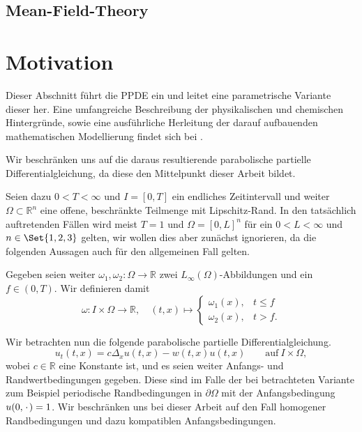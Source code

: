 \subsection{Mean-Field-Theory} %
\label{sub:mean_field_theory}



\section{Motivation} %
\label{sec:einf_hrung_der_ppde}

Dieser Abschnitt führt die PPDE ein und leitet eine parametrische Variante dieser her.
Eine umfangreiche Beschreibung der physikalischen und chemischen Hintergründe, sowie eine ausführliche Herleitung der darauf aufbauenden mathematischen Modellierung findet sich bei \textcite{Fredrickson:2006th}.

Wir beschränken uns auf die daraus resultierende parabolische partielle Differentialgleichung, da diese den Mittelpunkt dieser Arbeit bildet.

Seien dazu $0 < T < \infty$ und $I = [0, T]$ ein endliches Zeitintervall und weiter $\Omega \subset \mathbb{R}^{n}$ eine offene, beschränkte Teilmenge mit Lipschitz-Rand.
In den tatsächlich auftretenden Fällen wird meist $T = 1$ und $\Omega = [0, L]^n$ für ein $0 < L < \infty$ und $n \in \Set{1, 2, 3}$ gelten, wir wollen dies aber zunächst ignorieren, da die folgenden Aussagen auch für den allgemeinen Fall gelten.

Gegeben seien weiter $\omega_{1}, \omega_{2} \colon \Omega \to \mathbb{R}$ zwei $L_{\infty}(\Omega)$-Abbildungen und ein $f \in (0, T)$.
Wir definieren damit
\begin{equation}
    \omega \colon I \times \Omega \to \mathbb{R}, \quad (t, x) \mapsto
    \begin{cases}
        \omega_{1}(x), & t \leq f \\
        \omega_{2}(x), & t > f.
    \end{cases}
\end{equation}

Wir betrachten nun die folgende parabolische partielle Differentialgleichung.
\begin{equation}
    u_{t}(t, x) = c \Delta_{x} u(t, x) - w(t, x) u(t, x) \qquad \text{auf}~I \times \Omega,
\end{equation}
wobei $c \in \mathbb{R}$ eine Konstante ist, und es seien weiter Anfangs- und Randwertbedingungen gegeben.
Diese sind im Falle der bei \textcite{Stasiak:2011ba} betrachteten Variante zum Beispiel periodische Randbedingungen in $\partial \Omega$ mit der Anfangsbedingung $u(0, {\mkern2mu\cdot\mkern2mu}) = 1$.
Wir beschränken uns bei dieser Arbeit auf den Fall homogener Randbedingungen und
dazu kompatiblen Anfangsbedingungen.




